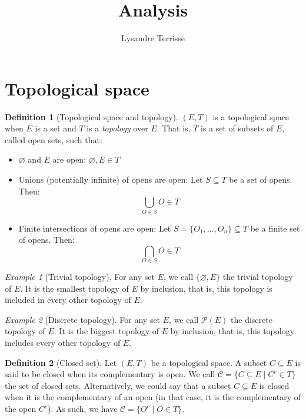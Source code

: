\documentclass{article}
\title{Analysis}
\author{Lysandre Terrisse}
\theoremstyle{definition}
\newtheorem{definition}{Definition}[section]
\theoremstyle{remark}
\theoremstyle{example}
\newtheorem{example}{Example}[section]
\theoremstyle{notation}
\newcommand{\closed}{\mathcal{C}}
\begin{document}
\maketitle

\section{Topological space}

\begin{definition}[Topological space and topology]
		$(E, T)$ is a topological space when $E$ is a set and $T$ is a \textit{topology} over $E$. That is, $T$ is a set of subsets of $E$, called open sets, such that:
		\begin{itemize}
				\item $\varnothing$ and $E$ are open: $\varnothing, E \in T$
				\item Unions (potentially infinite) of opens are open: Let $S \subseteq T$ be a set of opens. Then:
						$$\bigcup_{O \in S} O \in T$$
				\item Finite intersections of opens are open: Let $S = \{O_1, \dots, O_n\} \subseteq T$ be a finite set of opens. Then:
						$$\bigcap_{O \in S} O \in T$$
		\end{itemize}
\end{definition}

\begin{example}[Trivial topology]
		For any set $E$, we call $\{\varnothing, E\}$ the trivial topology of $E$. It is the smallest topology of $E$ by inclusion, that is, this topology is included in every other topology of $E$.
\end{example}

\begin{example}[Discrete topology]
		For any set $E$, we call $\mathcal{P}(E)$ the discrete topology of $E$. It is the biggest topology of $E$ by inclusion, that is, this topology includes every other topology of $E$.
\end{example}

\begin{definition}[Closed set]
		Let $(E, T)$ be a topological space. A subset $C \subseteq E$ is said to be closed when its complementary is open. We call $\closed = \{C \subseteq E \mid C^c \in T\}$ the set of closed sets. Alternatively, we could say that a subset $C \subseteq E$ is closed when it is the complementary of an open (in that case, it is the complementary of the open $C^c$). As such, we have $\closed = \{O^c \mid O \in T\}$.
\end{definition}
\end{document}
